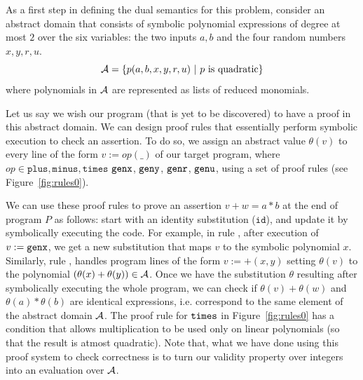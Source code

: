 \documentclass[preprint]{sig-alternate-05-2015}
\begin{document}
As a first step in defining the dual semantics for this problem,
consider an abstract domain that consists of symbolic polynomial expressions
of degree at most $2$ over the six variables: the two inputs $a,b$ and the
four random numbers $x,y,r,u$.
$${\cal A} = \{p(a, b, x, y, r, u)~|~p\mbox{ is quadratic}\}$$
where polynomials in ${\cal A}$ are represented as lists of reduced monomials.

Let us say we wish our program (that is yet to be discovered)
to have a proof in this abstract domain.  
We can design proof rules that essentially perform
symbolic execution to check an assertion.
To do so, we assign an abstract value $\theta(v)$
to every line of the form $v:=op(\_)$
of our target program, where 
$op\in \mathtt{plus}, \mathtt{minus}, \mathtt{times}$
$\mbox{${\mathtt{genx}}$}$,
$\mbox{${\mathtt{geny}}$}$,
$\mbox{${\mathtt{genr}}$}$,
$\mbox{${\mathtt{genu}}$}$,
using a set of proof rules (see Figure~\ref{fig:rules0}).

We can use these proof rules to prove an assertion $v+w=a*b$ 
at the end of program $P$ as follows:
start with an identity substitution ($\mathtt{id}$), and update
it by symbolically executing the code. For example, 
in rule {\genx}, after execution
of $v := \mbox{${\mathtt{genx}}$}$, we get a new substitution that maps $v$ to the symbolic
polynomial $x$. Similarly, 
rule {\plus},  handles program lines of the form 
$v := \plus(x, y)$ setting $\theta(v)$ to the polynomial $(\theta(x) + \theta(y))\in {\cal A}$.
Once we have the substitution $\theta$ resulting
after symbolically executing the whole program, we can check if 
$\theta(v)+\theta(w)$ and $\theta(a)*\theta(b)$ 
are identical expressions, i.e. correspond to the same element of the abstract domain ${\cal A}$.
The proof rule for $\mbox{${\mathtt{times}}$}$ in Figure~\ref{fig:rules0} has a condition
that allows multiplication to be used only on linear polynomials (so that
the result is atmost quadratic).
Note that, what we have done using this proof system to
check correctness is to turn our validity property over 
integers into an evaluation over ${\cal A}$.
\end{document}
